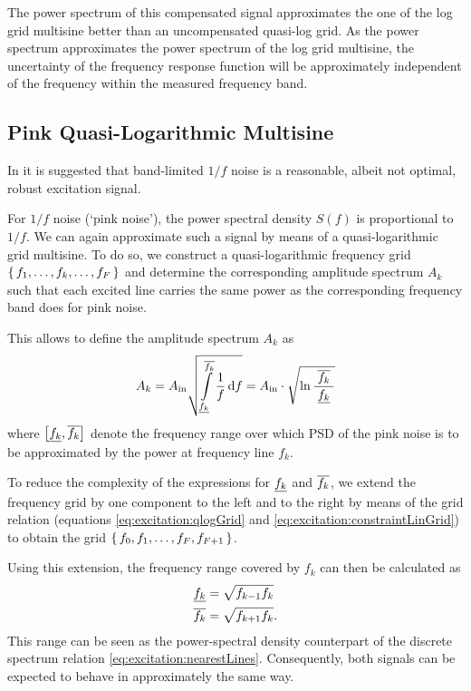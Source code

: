   The power spectrum of this compensated signal approximates the one of the log grid multisine better than an uncompensated quasi-log grid.
  As the power spectrum approximates the power spectrum of the log grid multisine, the uncertainty of the frequency response function will be approximately independent of the frequency within the measured frequency band.

  \subsection{Pink Quasi-Logarithmic Multisine}
  In \citep{Rojas2007} it is suggested that band-limited $1/f$ noise is a reasonable, albeit not optimal, robust excitation signal.

  For $1/f$ noise (`pink noise'), the power spectral density $S(f)$ is proportional to $1/f$.
  We can again approximate such a signal by means of a quasi-logarithmic grid multisine.
  To do so, we construct a quasi-logarithmic frequency grid $\set{f_1,\ldots,f_k,\ldots,f_F}$ and determine the corresponding amplitude spectrum $A_k$ such that each excited line carries the same power as the corresponding frequency band does for pink noise.

  This allows to define the amplitude spectrum $A_k$ as
  \begin{equation}
    A_k = A_{\mathrm{in}}
                 \sqrt{\int_{\underline{f_{k}}}
                     ^{\overline{f_{k}}}
                     \limits
                     \frac{1}
                          {f}
                     \,\mathrm{d}{f}}
          = A_{\mathrm{in}}
                \cdot
                \sqrt{
                \ln \frac{\;\overline{f_{k}}\;}{\underline{f_{k}}}
                }
  \end{equation}
  where $\left[ \underline{f_{k}}, \overline{f_{k}} \right] $ denote the frequency range over which \gls{PSD} of the pink noise is to be approximated by the power at frequency line $f_k$.

  To reduce the complexity of the expressions for $\underline{f_{k}}$ and $\overline{f_{k}}$, we extend the frequency grid by one component to the left and to the right by means of the grid relation (equations \eqref{eq:excitation:qlogGrid} and \eqref{eq:excitation:constraintLinGrid}) to obtain the grid $\set{f_0, f_1, \ldots, f_F, f_{F+1}}$.

  Using this extension, the frequency range covered by $f_k$ can then be calculated as
    \begin{align}
      \underline{f_{k}} &= \sqrt{f_{k-1} f_k}\\
      \overline{f_{k}} &= \sqrt{f_{k+1} f_k}
    \label{eq:excitation:fRange}
    \text{.}
    \end{align}
  This range can be seen as the power-spectral density counterpart of the discrete spectrum relation \eqref{eq:excitation:nearestLines}.
  Consequently, both signals can be expected to behave in approximately the same way.


